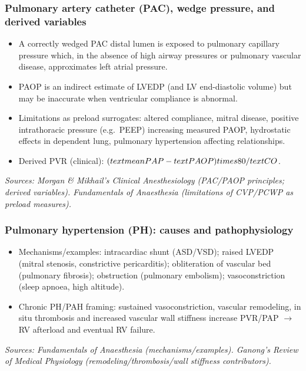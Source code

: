\documentclass[11pt,a4paper]{article}
\begin{document}
\subsubsection{Pulmonary artery catheter (PAC), wedge pressure, and derived variables}
\begin{itemize}
  \item A correctly wedged PAC distal lumen is exposed to pulmonary capillary pressure which, in the absence of high airway pressures or pulmonary vascular disease, approximates left atrial pressure.
  \item PAOP is an indirect estimate of LVEDP (and LV end-diastolic volume) but may be inaccurate when ventricular compliance is abnormal.
  \item Limitations as preload surrogates: altered compliance, mitral disease, positive intrathoracic pressure (e.g.\ PEEP) increasing measured PAOP, hydrostatic effects in dependent lung, pulmonary hypertension affecting relationships.
  \item Derived PVR (clinical): \((\\text{mean PAP} - \\text{PAOP}) \\times 80 / \\text{CO}\).
\end{itemize}
\noindent\textit{Sources: Morgan \& Mikhail’s Clinical Anesthesiology (PAC/PAOP principles; derived variables). Fundamentals of Anaesthesia (limitations of CVP/PCWP as preload measures).}

\subsubsection{Pulmonary hypertension (PH): causes and pathophysiology}
\begin{itemize}
  \item Mechanisms/examples: intracardiac shunt (ASD/VSD); raised LVEDP (mitral stenosis, constrictive pericarditis); obliteration of vascular bed (pulmonary fibrosis); obstruction (pulmonary embolism); vasoconstriction (sleep apnoea, high altitude).
  \item Chronic PH/PAH framing: sustained vasoconstriction, vascular remodeling, in situ thrombosis and increased vascular wall stiffness increase PVR/PAP \(\rightarrow\) RV afterload and eventual RV failure.
\end{itemize}
\noindent\textit{Sources: Fundamentals of Anaesthesia (mechanisms/examples). Ganong’s Review of Medical Physiology (remodeling/thrombosis/wall stiffness contributors).}
\end{document}
